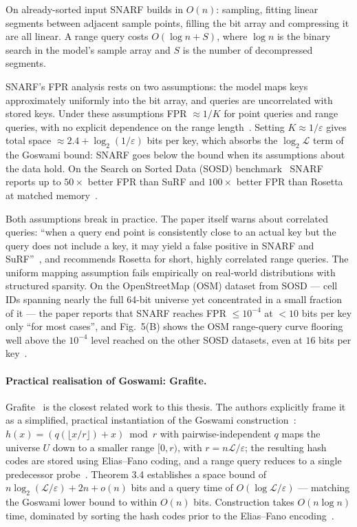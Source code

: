 On already-sorted input SNARF builds in $O(n)$: sampling, fitting
linear segments between adjacent sample points, filling the bit
array and compressing it are all linear.
A range query costs $O(\log n + S)$, where $\log n$
is the binary search in the model's sample array and $S$ is the
number of decompressed segments.

SNARF's FPR analysis rests on two assumptions: the model maps
keys approximately uniformly into the bit array, and queries are
uncorrelated with stored keys. Under these assumptions FPR
$\approx 1/K$ for point queries and range queries, with no
explicit dependence on the range
length~\citep[\S3]{vaidya2022snarf}. Setting $K \approx
1/\varepsilon$ gives total space $\approx 2.4 +
\log_2(1/\varepsilon)$ bits per key, which absorbs the
$\log_2 \mathcal{L}$ term of the Goswami bound: SNARF goes below the
bound when its assumptions about the data hold.
On the Search on Sorted Data (SOSD)
benchmark~\citep{kipf2019sosd} SNARF reports up to $50\times$
better FPR than SuRF and $100\times$ better FPR than Rosetta at
matched memory~\citep[\S2]{vaidya2022snarf}.

Both assumptions break in practice.
The paper itself warns about correlated queries: ``when a query end point is consistently
close to an actual key but the query does not include a key, it
may yield a false positive in SNARF and
SuRF''~\citep[\S4.1]{vaidya2022snarf}, and recommends Rosetta for
short, highly correlated range queries. The uniform mapping
assumption fails empirically on real-world distributions with
structured sparsity. On the OpenStreetMap (OSM) dataset from SOSD
--- cell IDs spanning nearly the full 64-bit universe yet
concentrated in a small fraction of it --- the paper reports that
SNARF reaches FPR $\leq 10^{-4}$ at $< 10$ bits per key only
``for most cases'', and Fig.~5(B) shows the OSM range-query curve
flooring well above the $10^{-4}$ level reached on the other SOSD
datasets, even at $16$ bits per
key~\citep[\S6.1.2, Fig.~5(B)]{vaidya2022snarf}.

\paragraph{Practical realisation of Goswami: Grafite.}
Grafite~\citep{grafite2024} is the closest related work to this thesis.
The authors explicitly frame it as a simplified, practical
instantiation of the Goswami construction~\citep[\S3]{grafite2024}:
$h(x) = (q(\lfloor x/r \rfloor) + x) \bmod r$ with
pairwise-independent $q$ maps the universe $U$ down to a smaller
range $[0, r)$, with $r = n\mathcal{L}/\varepsilon$; the resulting hash
codes are stored using Elias--Fano coding, and a range query reduces
to a single predecessor probe~\citep[Algorithm 2]{grafite2024}.
Theorem 3.4 establishes a space bound of
$n \log_2(\mathcal{L}/\varepsilon) + 2n + o(n)$ bits and a query
time of $O(\log \mathcal{L}/\varepsilon)$ --- matching the Goswami
lower bound to within $O(n)$ bits.
Construction takes $O(n \log n)$ time, dominated by sorting the
hash codes prior to the Elias--Fano
encoding~\citep[Algorithm 1]{grafite2024}.

